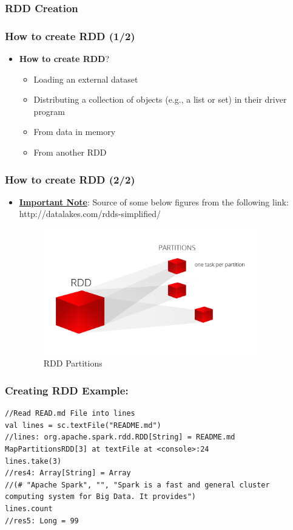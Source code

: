 \subsubsection{RDD Creation}

\begin{frame}
  \frametitle{How to create RDD (1/2)}
	\begin{itemize}[<+->]
		\item \textbf{How to create RDD}?
			\begin{itemize}
				\item Loading an external dataset
				\item Distributing a collection of objects (e.g., a list or set) in their driver program
				\item From data in memory
				\item From another RDD
			\end{itemize}
	\end{itemize}
\end{frame}

\begin{frame}
	\frametitle{How to create RDD (2/2)}
	\begin{itemize}[<+->]
		\item \textbf{\underline{Important Note}}: Source of some below figures from the following link:  http://datalakes.com/rdds-simplified/
		\begin{figure}
			\caption{RDD Partitions}  		  	
			\includegraphics[width=\textwidth,height=5.5cm]{Graphics/RDD_Patitions.PNG}
		\end{figure}
		
	\end{itemize}
\end{frame}

%
%
%
\begin{frame}[fragile]
  \frametitle{Creating RDD Example:}

			\begin{lstlisting}[style=myScalastyle, caption=Creating RDD Example]
//Read READ.md File into lines 
val lines = sc.textFile("README.md")
//lines: org.apache.spark.rdd.RDD[String] = README.md MapPartitionsRDD[3] at textFile at <console>:24			
lines.take(3)
//res4: Array[String] = Array
//(# "Apache Spark", "", "Spark is a fast and general cluster computing system for Big Data. It provides")		
lines.count
//res5: Long = 99
			\end{lstlisting}

\end{frame}

